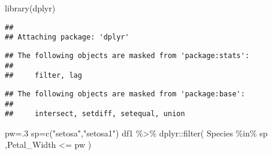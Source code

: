 \documentclass[
]{article}
\newenvironment{Shaded}{\begin{snugshade}}{\end{snugshade}}
\newcommand{\DecValTok}[1]{\textcolor[rgb]{0.00,0.00,0.81}{#1}}
\newcommand{\FunctionTok}[1]{\textcolor[rgb]{0.00,0.00,0.00}{#1}}
\newcommand{\NormalTok}[1]{#1}
\newcommand{\OtherTok}[1]{\textcolor[rgb]{0.56,0.35,0.01}{#1}}
\newcommand{\SpecialCharTok}[1]{\textcolor[rgb]{0.00,0.00,0.00}{#1}}
\newcommand{\StringTok}[1]{\textcolor[rgb]{0.31,0.60,0.02}{#1}}
\begin{document}
\begin{Shaded}
\begin{Highlighting}[]
\FunctionTok{library}\NormalTok{(dplyr)}
\end{Highlighting}
\end{Shaded}

\begin{verbatim}
## 
## Attaching package: 'dplyr'
\end{verbatim}

\begin{verbatim}
## The following objects are masked from 'package:stats':
## 
##     filter, lag
\end{verbatim}

\begin{verbatim}
## The following objects are masked from 'package:base':
## 
##     intersect, setdiff, setequal, union
\end{verbatim}

\begin{Shaded}
\begin{Highlighting}[]
\NormalTok{pw}\OtherTok{=}\NormalTok{.}\DecValTok{3}
\NormalTok{sp}\OtherTok{=}\FunctionTok{c}\NormalTok{(}\StringTok{"setosa"}\NormalTok{,}\StringTok{"setosa1"}\NormalTok{)}
\NormalTok{df1 }\SpecialCharTok{\%\textgreater{}\%}
\NormalTok{  dplyr}\SpecialCharTok{::}\FunctionTok{filter}\NormalTok{(}
\NormalTok{    Species }\SpecialCharTok{\%in\%}\NormalTok{ sp}
\NormalTok{    ,Petal\_Width }\SpecialCharTok{\textless{}=}\NormalTok{ pw           }
\NormalTok{  )}
\end{Highlighting}
\end{Shaded}
\end{document}
